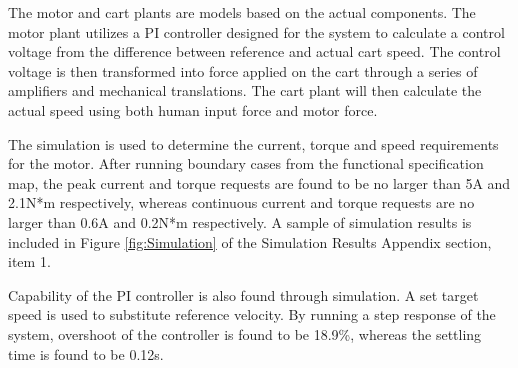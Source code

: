 The motor and cart plants are models based on the actual components. The motor plant utilizes a PI controller designed for the system to calculate a control voltage from the difference between reference and actual cart speed. The control voltage is then transformed into force applied on the cart through a series of amplifiers and mechanical translations. The cart plant will then calculate the actual speed using both human input force and motor force.

The simulation is used to determine the current, torque and speed requirements for the motor. After running boundary cases from the functional specification map, the peak current and torque requests are found to be no larger than 5A and 2.1N*m respectively, whereas continuous current and torque requests are no larger than 0.6A and 0.2N*m respectively. A sample of simulation results is included in Figure \ref{fig:Simulation} of the Simulation Results Appendix section, item 1.

Capability of the PI controller is also found through simulation. A set target speed is used to substitute reference velocity. By running a step response of the system, overshoot of the controller is found to be 18.9\%, whereas the settling time is found to be 0.12s.